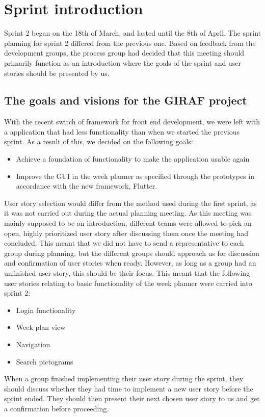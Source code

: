 \section{Sprint introduction}
Sprint 2 began on the 18th of March, and lasted until the 8th of April.
The sprint planning for sprint 2 differed from the previous one.
Based on feedback from the development groups, the process group had decided that this meeting should primarily function as an introduction where the goals of the sprint and user stories should be presented by us.

\subsection{The goals and visions for the GIRAF project}
With the recent switch of framework for front end development, we were left with a application that had less functionality than when we started the previous sprint.
As a result of this, we decided on the following goals:
\begin{itemize}
    \item Achieve a foundation of functionality to make the application usable again
    \item Improve the GUI in the week planner as specified through the prototypes in accordance with the new framework, Flutter.
\end{itemize}
User story selection would differ from the method used during the first sprint, as it was not carried out during the actual planning meeting.
As this meeting was mainly supposed to be an introduction, different teams were allowed to pick an open, highly prioritized user story after discussing them once the meeting had concluded.
This meant that we did not have to send a representative to each group during planning, but the different groups should approach us for discussion and confirmation of user stories when ready.
However, as long as a group had an unfinished user story, this should be their focus.
This meant that the following user stories relating to basic functionality of the week planner were carried into sprint 2:
\begin{itemize}
    \item Login functionality
    \item Week plan view
    \item Navigation
    \item Search pictograms
\end{itemize}
When a group finished implementing their user story during the sprint, they should discuss whether they had time to implement a new user story before the sprint ended. They should then present their next chosen user story to us and get a confirmation before proceeding.

